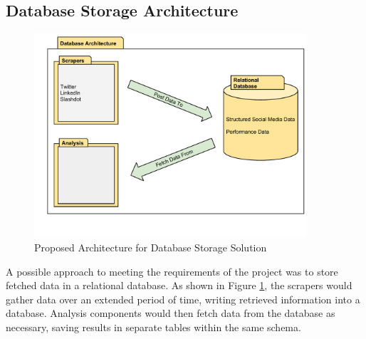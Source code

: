 

\subsection{Database Storage Architecture}

\begin{figure}[h!]
\begin{center} 
 \centering
  \includegraphics[width=0.9\textwidth]{Images/Database_Architecture.pdf}
 \caption{Proposed Architecture for Database Storage Solution}
 \label{fig:database_storage}
\end{center}
 \end{figure}

A possible approach to meeting the requirements of the project was to store fetched data in a relational database. As shown in Figure \ref{fig:database_storage}, the scrapers would gather data over an extended period of time, writing retrieved information into a database. Analysis components would then fetch data from the database as necessary, saving results in separate tables within the same schema.

